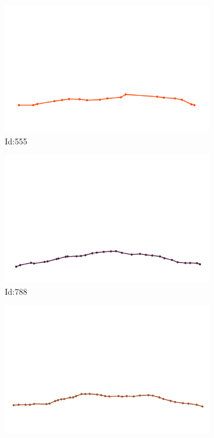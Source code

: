 \documentclass[12pt,twoside]{report}
\begin{document}
\begin{figure}
\centering
\begin{subfigure}[b]{0.20\textwidth}
\centering
\includegraphics[width=\textwidth]{../../trajectories/555.png}
\caption{Id:555}
\end{subfigure}
\begin{subfigure}[b]{0.20\textwidth}
\centering
\includegraphics[width=\textwidth]{../../trajectories/788.png}
\caption{Id:788}
\end{subfigure}
\begin{subfigure}[b]{0.20\textwidth}
\centering
\includegraphics[width=\textwidth]{../../trajectories/817.png}

\end{subfigure}
\end{figure}
\end{document}
